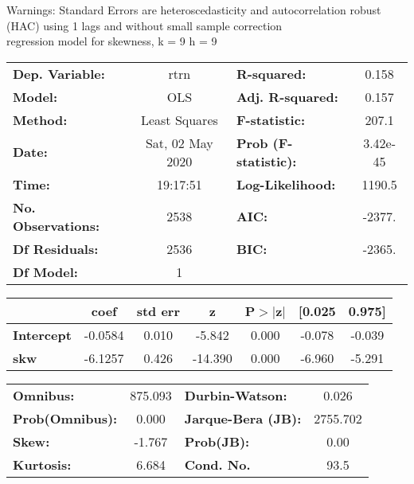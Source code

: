 Warnings: \newline
 [1] Standard Errors are heteroscedasticity and autocorrelation robust (HAC) using 1 lags and without small sample correction\\ 

regression model for skewness, k = 9 h = 9\begin{center}
\begin{tabular}{lclc}
\toprule
\textbf{Dep. Variable:}    &       rtrn       & \textbf{  R-squared:         } &     0.158   \\
\textbf{Model:}            &       OLS        & \textbf{  Adj. R-squared:    } &     0.157   \\
\textbf{Method:}           &  Least Squares   & \textbf{  F-statistic:       } &     207.1   \\
\textbf{Date:}             & Sat, 02 May 2020 & \textbf{  Prob (F-statistic):} &  3.42e-45   \\
\textbf{Time:}             &     19:17:51     & \textbf{  Log-Likelihood:    } &    1190.5   \\
\textbf{No. Observations:} &        2538      & \textbf{  AIC:               } &    -2377.   \\
\textbf{Df Residuals:}     &        2536      & \textbf{  BIC:               } &    -2365.   \\
\textbf{Df Model:}         &           1      & \textbf{                     } &             \\
\bottomrule
\end{tabular}
\begin{tabular}{lcccccc}
                   & \textbf{coef} & \textbf{std err} & \textbf{z} & \textbf{P$> |$z$|$} & \textbf{[0.025} & \textbf{0.975]}  \\
\midrule
\textbf{Intercept} &      -0.0584  &        0.010     &    -5.842  &         0.000        &       -0.078    &       -0.039     \\
\textbf{skw}       &      -6.1257  &        0.426     &   -14.390  &         0.000        &       -6.960    &       -5.291     \\
\bottomrule
\end{tabular}
\begin{tabular}{lclc}
\textbf{Omnibus:}       & 875.093 & \textbf{  Durbin-Watson:     } &    0.026  \\
\textbf{Prob(Omnibus):} &   0.000 & \textbf{  Jarque-Bera (JB):  } & 2755.702  \\
\textbf{Skew:}          &  -1.767 & \textbf{  Prob(JB):          } &     0.00  \\
\textbf{Kurtosis:}      &   6.684 & \textbf{  Cond. No.          } &     93.5  \\
\bottomrule
\end{tabular}
\end{center}

